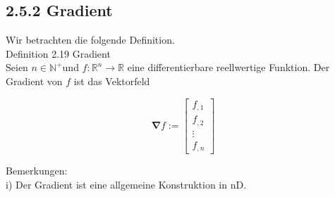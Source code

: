 \documentclass[10pt]{article}
\begin{document}
\subsection*{2.5.2 Gradient}
Wir betrachten die folgende Definition.\\
Definition 2.19 Gradient\\
Seien $n \in \mathbb{N}^{+}$und $f: \mathbb{R}^{n} \rightarrow \mathbb{R}$ eine differentierbare reellwertige Funktion. Der Gradient von $f$ ist das Vektorfeld

\[
\boldsymbol{\nabla} f:=\left[\begin{array}{l}
f_{, 1}  \tag{2.137}\\
f_{, 2} \\
\vdots \\
f_{, n}
\end{array}\right]
\]

Bemerkungen:\\
i) Der Gradient ist eine allgemeine Konstruktion in nD.
\end{document}
